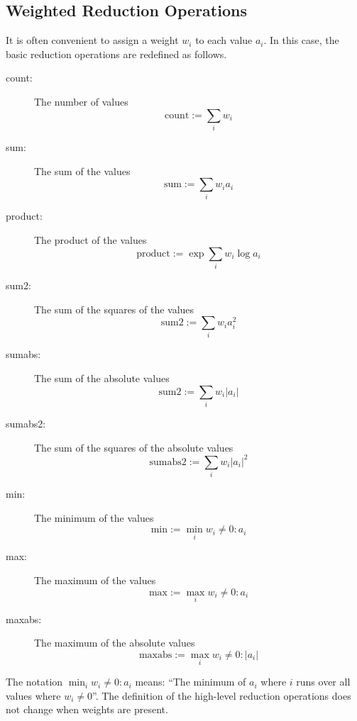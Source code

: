 \subsection{Weighted Reduction Operations}
It is often convenient to assign a weight $w_i$ to each value $a_i$.
In this case, the basic reduction operations are redefined as follows.
\begin{description}
\item[count:] The number of values
$$ \mathrm{count} := \sum_i w_i $$
\item[sum:] The sum of the values
$$ \mathrm{sum} := \sum_i w_i a_i $$
\item[product:] The product of the values
$$ \mathrm{product} := \exp \sum_i w_i \log a_i $$
\item[sum2:] The sum of the squares of the values
$$ \mathrm{sum2} := \sum_i w_i a_i^2 $$
\item[sumabs:] The sum of the absolute values
$$ \mathrm{sum2} := \sum_i w_i |a_i| $$
\item[sumabs2:] The sum of the squares of the absolute values
$$ \mathrm{sumabs2} := \sum_i w_i |a_i|^2 $$
\item[min:] The minimum of the values
$$ \mathrm{min} := \min_i w_i \ne 0: a_i $$
\item[max:] The maximum of the values
$$ \mathrm{max} := \max_i w_i \ne 0: a_i $$
\item[maxabs:] The maximum of the absolute values
$$ \mathrm{maxabs} := \max_i w_i \ne 0: |a_i| $$
\end{description}
The notation $\min_i w_i \ne 0: a_i$ means: ``The minimum of $a_i$
where $i$ runs over all values where $w_i \ne 0$''.  The definition of
the high-level reduction operations does not change when weights are
present.



